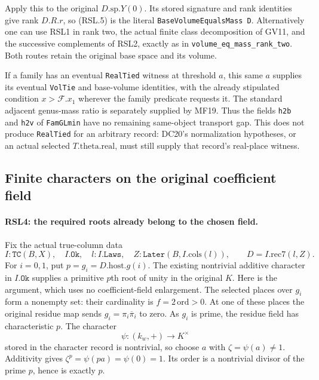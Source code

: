 Apply this to the original $D.\mathrm{sp}.Y(0)$.
Its stored signature and rank identities give rank $D.R.r$, so
(RSL.5) is the literal \texttt{BaseVolumeEqualsMass D}.  Alternatively
one can use RSL1 in rank two, the actual finite class decomposition
of GV11, and the successive complements of RSL2, exactly as in
\texttt{volume\_eq\_mass\_rank\_two}.  Both routes retain the
original base space and its volume.

If a family has an eventual \texttt{RealTied} witness at threshold
$a$, this same $a$ supplies its eventual \texttt{VolTie} and
base-volume identities, with the already stipulated condition
$x>\mathcal F.x_1$ wherever the family predicate requests it.
The standard adjacent genus-mass ratio is separately supplied by
MF19.  Thus the fields \texttt{h2b} and \texttt{h2v} of
\texttt{FamGLmin} have no remaining same-object transport gap.
This does not produce \texttt{RealTied} for an arbitrary record:
DC20's normalization hypotheses, or an actual selected
$T.\mathrm{theta}.\mathrm{real}$, must still supply that record's
real-place witness.

\subsection{Finite characters on the original coefficient field}

\paragraph{RSL4: the required roots already belong to the chosen field.}
\label{claim:RSL4}
Fix the actual true-column data
\[
 I:\texttt{TC}(B,X),\quad I.\texttt{Ok},\quad
 l:I.\texttt{Laws},\quad Z:\texttt{Later}(B,I.\mathrm{cols}(l)),
 \qquad D=I.\mathrm{rec7}(l,Z).
                                                                  \tag{RSL.6}
\]
For $i=0,1$, put $p=g_i=D.\mathrm{host}.g(i)$.
The existing nontrivial additive character in $I.\texttt{Ok}$
supplies a primitive $p$th root of unity in the original $K$.
Here is the argument, which uses no coefficient-field enlargement.
The selected places over $g_i$ form a nonempty set: their cardinality
is $f=2\,\mathrm{ord}>0$.  At one of these places the original
residue map sends $g_i=\pi_i\overline\pi_i$ to zero.  As $g_i$ is
prime, the residue field has characteristic $p$.  The character
\[
                    \psi:(k_w,+)\longrightarrow K^\times
\]
stored in the character record is nontrivial, so choose $a$ with
$\zeta=\psi(a)\ne1$.  Additivity gives
$\zeta^p=\psi(pa)=\psi(0)=1$.  Its order is a nontrivial divisor
of the prime $p$, hence is exactly $p$.

